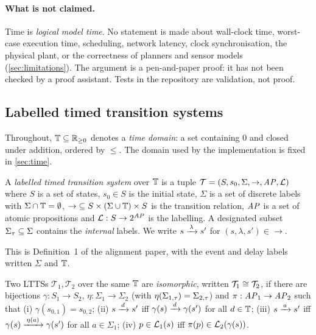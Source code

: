 \paragraph{What is not claimed.}
Time is \emph{logical model time}. No statement is made about wall-clock
time, worst-case execution time, scheduling, network latency, clock
synchronisation, the physical plant, or the correctness of planners and
sensor models (\cref{sec:limitations}). The argument is a pen-and-paper proof:
it has not been checked by a proof assistant. Tests in the repository are
validation, not proof.

\subsection{Labelled timed transition systems}

Throughout, $\mathbb{T}\subseteq\mathbb{R}_{\geq 0}$ denotes a \emph{time domain}: a set containing
$0$ and closed under addition, ordered by $\le$. The domain used by the
implementation is fixed in \cref{sec:time}.

\begin{definition}[LTTS]\label{def:ltts}
A \emph{labelled timed transition system} over $\mathbb{T}$ is a tuple
$\mathcal{T}=(S,s_0,\Sigma,\to,\mathit{AP},\mathcal{L})$ where $S$ is a set of states,
$s_0\in S$ is the initial state, $\Sigma$ is a set of discrete labels with
$\Sigma\cap\mathbb{T}=\emptyset$, ${\to}\subseteq S\times(\Sigma\cup\mathbb{T})\times S$ is the
transition relation, $\mathit{AP}$ is a set of atomic propositions and
$\mathcal{L}:S\to2^{\mathit{AP}}$ is the labelling. A designated subset
$\Sigma_\tau\subseteq\Sigma$ contains the \emph{internal} labels.
We write $s\xrightarrow{\,\lambda\,}s'$ for $(s,\lambda,s')\in{\to}$.
\end{definition}

This is Definition~1 of the alignment paper, with the event and delay labels
written $\Sigma$ and $\mathbb{T}$.

\begin{definition}[Isomorphism]\label{def:iso}
Two LTTSs $\mathcal{T}_1,\mathcal{T}_2$ over the same $\mathbb{T}$ are
\emph{isomorphic}, written $\mathcal{T}_1\cong\mathcal{T}_2$, if there are
bijections $\gamma:S_1\to S_2$, $\eta:\Sigma_1\to\Sigma_2$ (with
$\eta(\Sigma_{1,\tau})=\Sigma_{2,\tau}$) and $\pi:\mathit{AP}_1\to\mathit{AP}_2$ such that
(i) $\gamma(s_{0,1})=s_{0,2}$;
(ii) $s\xrightarrow{\,d\,}s'$ iff $\gamma(s)\xrightarrow{\,d\,}\gamma(s')$ for all $d\in\mathbb{T}$;
(iii) $s\xrightarrow{\,a\,}s'$ iff $\gamma(s)\xrightarrow{\,\eta(a)\,}\gamma(s')$ for all $a\in\Sigma_1$;
(iv) $p\in\mathcal{L}_1(s)$ iff $\pi(p)\in\mathcal{L}_2(\gamma(s))$.
\end{definition}

